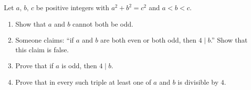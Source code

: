 Let $a$, $b$, $c$ be positive integers with $a^2+b^2=c^2$ and $a<b<c$.
\begin{enumerate}
\item[(a)] Show that $a$ and $b$ cannot both be odd.
\item[(b)] Someone claims: ``if $a$ and $b$ are both even or both odd, then $4\mid b$.'' Show that this claim is false.
\item[(c)] Prove that if $a$ is odd, then $4\mid b$.
\item[(d)] Prove that in every such triple at least one of $a$ and $b$ is divisible by $4$.
\end{enumerate}
